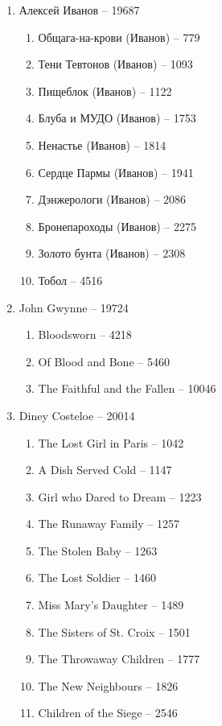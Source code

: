 \documentclass[a4paper, 11pt]{proc} %
\begin{document}
\begin{enumerate}
    \item Алексей Иванов -- 19687
        \begin{enumerate}
            \item Общага-на-крови (Иванов) -- 779
            \item Тени Тевтонов (Иванов) -- 1093
            \item Пищеблок (Иванов) -- 1122
            \item Блуба и МУДО (Иванов) -- 1753
            \item Ненастье (Иванов) -- 1814
            \item Сердце Пармы (Иванов) -- 1941
            \item Дэнжерологи (Иванов) -- 2086
            \item Бронепароходы (Иванов) -- 2275
            \item Золото бунта (Иванов) -- 2308
            \item Тобол -- 4516
        \end{enumerate}
    \item John Gwynne -- 19724
        \begin{enumerate}
            \item Bloodsworn -- 4218
            \item Of Blood and Bone -- 5460
            \item The Faithful and the Fallen -- 10046
        \end{enumerate}
    \item Diney Costeloe -- 20014
        \begin{enumerate}
            \item The Lost Girl in Paris -- 1042
            \item A Dish Served Cold -- 1147
            \item Girl who Dared to Dream -- 1223
            \item The Runaway Family -- 1257
            \item The Stolen Baby -- 1263
            \item The Lost Soldier -- 1460
            \item Miss Mary's Daughter -- 1489
            \item The Sisters of St. Croix -- 1501
            \item The Throwaway Children -- 1777
            \item The New Neighbours -- 1826
            \item Children of the Siege -- 2546

\end{enumerate}
\end{enumerate}
\end{document}
